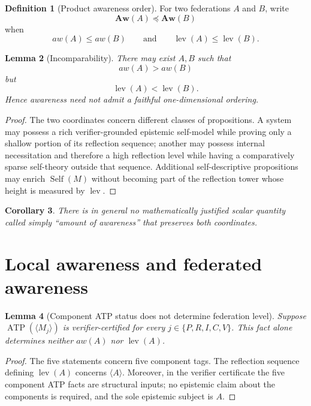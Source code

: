 \documentclass[11pt]{article}
\theoremstyle{definition}
\newtheorem{definition}{Definition}[section]
\theoremstyle{plain}
\newtheorem{lemma}[definition]{Lemma}
\newtheorem{corollary}[definition]{Corollary}
\newcommand{\lev}{\operatorname{lev}}
\newcommand{\Self}{\operatorname{Self}}
\newcommand{\ATP}{\operatorname{ATP}}
\newcommand{\Aw}{\mathbf{Aw}}
\begin{document}
\begin{definition}[Product awareness order]
For two federations $A$ and $B$, write
\[
\Aw(A)\preceq\Aw(B)
\]
when
\[
aw(A)\le aw(B)\qquad\text{and}\qquad\lev(A)\le\lev(B).
\]
\end{definition}

\begin{lemma}[Incomparability]
There may exist $A,B$ such that
\[
aw(A)>aw(B)
\]
but
\[
\lev(A)<\lev(B).
\]
Hence awareness need not admit a faithful one-dimensional ordering.
\end{lemma}

\begin{proof}
The two coordinates concern different classes of propositions. A system may possess a rich verifier-grounded epistemic self-model while proving only a shallow portion of its reflection sequence; another may possess internal necessitation and therefore a high reflection level while having a comparatively sparse self-theory outside that sequence. Additional self-descriptive propositions may enrich $\Self(M)$ without becoming part of the reflection tower whose height is measured by $\lev$.
\end{proof}

\begin{corollary}
There is in general no mathematically justified scalar quantity called simply ``amount of awareness'' that preserves both coordinates.
\end{corollary}

\section{Local awareness and federated awareness}

\begin{lemma}[Component ATP status does not determine federation level]
Suppose $\ATP(\langle M_j\rangle)$ is verifier-certified for every $j\in\{P,R,I,C,V\}$. This fact alone determines neither $aw(A)$ nor $\lev(A)$.
\end{lemma}

\begin{proof}
The five statements concern five component tags. The reflection sequence defining $\lev(A)$ concerns $\langle A\rangle$. Moreover, in the verifier certificate the five component ATP facts are structural inputs; no epistemic claim about the components is required, and the sole epistemic subject is $A$.
\end{proof}
\end{document}

